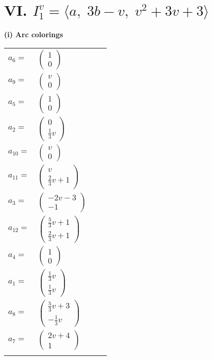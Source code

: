 \documentclass[1p]{elsarticle_modified}
\theoremstyle{definition}
\begin{document}
\centering \section*{VI. $I^v_{1}= \langle a,\;3 b- v,\;v^2+3 v+3 \rangle$}
\flushleft \textbf{(i) Arc colorings}\\
\begin{tabular}{m{7pt} m{180pt} m{7pt} m{180pt} }
\flushright $a_{6}=$&$\begin{pmatrix}1\\0\end{pmatrix}$ \\
\flushright $a_{9}=$&$\begin{pmatrix}v\\0\end{pmatrix}$ \\
\flushright $a_{5}=$&$\begin{pmatrix}1\\0\end{pmatrix}$ \\
\flushright $a_{2}=$&$\begin{pmatrix}0\\\frac{1}{3} v\end{pmatrix}$ \\
\flushright $a_{10}=$&$\begin{pmatrix}v\\0\end{pmatrix}$ \\
\flushright $a_{11}=$&$\begin{pmatrix}v\\\frac{2}{3} v+1\end{pmatrix}$ \\
\flushright $a_{3}=$&$\begin{pmatrix}-2 v-3\\-1\end{pmatrix}$ \\
\flushright $a_{12}=$&$\begin{pmatrix}\frac{5}{3} v+1\\\frac{2}{3} v+1\end{pmatrix}$ \\
\flushright $a_{4}=$&$\begin{pmatrix}1\\0\end{pmatrix}$ \\
\flushright $a_{1}=$&$\begin{pmatrix}\frac{1}{3} v\\\frac{1}{3} v\end{pmatrix}$ \\
\flushright $a_{8}=$&$\begin{pmatrix}\frac{5}{3} v+3\\-\frac{1}{3} v\end{pmatrix}$ \\
\flushright $a_{7}=$&$\begin{pmatrix}2 v+4\\1\end{pmatrix}$\\&\end{tabular}
\end{document}
